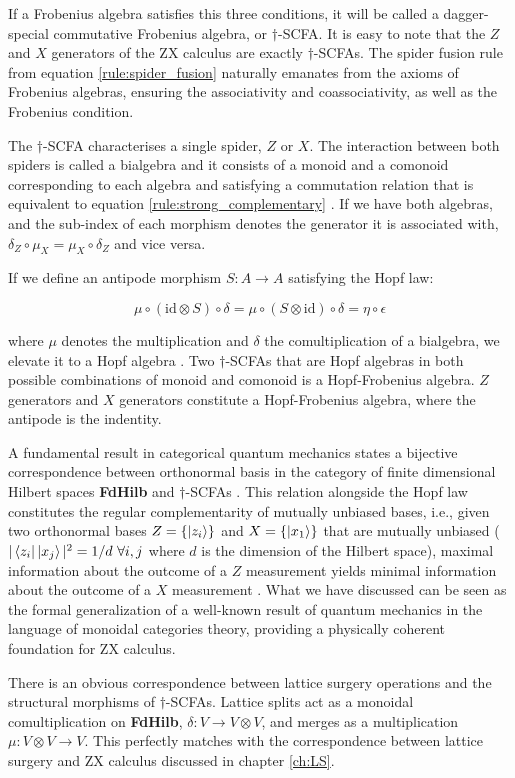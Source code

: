 \documentclass[12pt, twoside, openany]{book}
\newcommand{\catname}[1]{{\normalfont\textbf{#1}}}
\begin{document}
If a Frobenius algebra satisfies this three conditions, it will be called a dagger-special commutative Frobenius algebra, or $\dagger$-SCFA. It is easy to note that the $Z$ and $X$ generators of the ZX calculus are exactly $\dagger$-SCFAs. The spider fusion rule from equation \ref{rule:spider_fusion} naturally emanates from the axioms of Frobenius algebras, ensuring the associativity and coassociativity, as well as the Frobenius condition. 

The $\dagger$-SCFA characterises a single spider, $Z$ or $X$. The interaction between both spiders is called a bialgebra and it consists of a monoid and a comonoid corresponding to each algebra and satisfying a commutation relation that is equivalent to equation \ref{rule:strong_complementary} \cite{vandewetering2020zxcalculusworkingquantumcomputer}. If we have both algebras, and the sub-index of each morphism denotes the generator it is associated with, $\delta_Z \circ \mu_X = \mu_X \circ \delta_Z$ and vice versa. 

If we define an antipode morphism $S: A \rightarrow A$ satisfying the Hopf law:

\begin{equation} \label{Hopf_Law}
    \mu \circ (\text{id} \otimes S) \circ \delta =\mu \circ (S \otimes \text{id}) \circ \delta = \eta \circ \epsilon
\end{equation}

where $\mu$ denotes the multiplication and $\delta$ the comultiplication of a bialgebra, we elevate it to a Hopf algebra \cite{cowtan2025homologyhopfalgebrasquantum}. Two $\dagger$-SCFAs that are Hopf algebras in both possible combinations of monoid and comonoid is a Hopf-Frobenius algebra. $Z$ generators and $X$ generators constitute a Hopf-Frobenius algebra, where the antipode is the indentity.

A fundamental result in categorical quantum mechanics states a bijective correspondence between orthonormal basis in the category of finite dimensional Hilbert spaces \catname{FdHilb} and $\dagger$-SCFAs \cite{COECKE_2012}. This relation alongside the Hopf law constitutes the regular complementarity of mutually unbiased bases, i.e., given two orthonormal bases $Z = \{\ket{z_i}\}$ and $X = \{\ket{x_1}\}$ that are mutually unbiased ($|\bra{z_i} \ket{x_j}|^2 = 1/d \ \forall i,j$ where $d$ is the dimension of the Hilbert space), maximal information about the outcome of a $Z$ measurement yields minimal information about the outcome of a $X$ measurement \cite{KissingerWetering2024Book}. What we have discussed can be seen as the formal generalization of a well-known result of quantum mechanics in the language of monoidal categories theory, providing a physically coherent foundation for ZX calculus.

There is an obvious correspondence between lattice surgery operations and the structural morphisms of $\dagger$-SCFAs. Lattice splits act as a monoidal comultiplication on \catname{FdHilb}, $\delta: V \rightarrow V \otimes V$, and merges as a multiplication $\mu : V \otimes V\rightarrow V$. This perfectly matches with the correspondence between lattice surgery and ZX calculus discussed in chapter \ref{ch:LS}.
\end{document}
